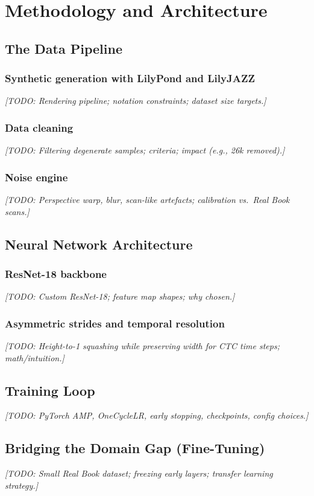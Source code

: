 \documentclass[11pt, a4paper]{report}
\begin{document}
\chapter{Methodology and Architecture}
\label{ch:method}
\section{The Data Pipeline}
\subsection{Synthetic generation with LilyPond and LilyJAZZ}
\textit{[TODO: Rendering pipeline; notation constraints; dataset size targets.]}

\subsection{Data cleaning}
\textit{[TODO: Filtering degenerate samples; criteria; impact (e.g., 26k removed).]}

\subsection{Noise engine}
\textit{[TODO: Perspective warp, blur, scan-like artefacts; calibration vs.\ Real Book scans.]}

\section{Neural Network Architecture}
\subsection{ResNet-18 backbone}
\textit{[TODO: Custom ResNet-18; feature map shapes; why chosen.]}

\subsection{Asymmetric strides and temporal resolution}
\textit{[TODO: Height-to-1 squashing while preserving width for CTC time steps; math/intuition.]}

\section{Training Loop}
\textit{[TODO: PyTorch AMP, OneCycleLR, early stopping, checkpoints, config choices.]}

\section{Bridging the Domain Gap (Fine-Tuning)}
\textit{[TODO: Small Real Book dataset; freezing early layers; transfer learning strategy.]}
\end{document}
